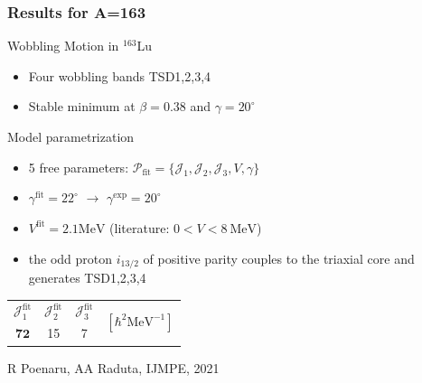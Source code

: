 \documentclass{beamer}
\begin{document}
\begin{frame}
  \frametitle{Results for A=163}
  \begin{exampleblock}{Wobbling Motion in $^{163}$Lu}
    \begin{itemize}
      \item Four wobbling bands TSD1,2,3,4
      \item Stable minimum at $\beta=0.38$ and $\gamma=20^\circ$
    \end{itemize}
    \end{exampleblock}
  \begin{alertblock}{Model parametrization}
    \begin{itemize}
      \item 5 free parameters: $\mathcal{P}_\text{fit}=\{\mathcal{J}_1,\mathcal{J}_2,\mathcal{J}_3,V,\gamma\}$
      \item $\gamma^\text{fit}=22^\circ$ $\rightarrow$ $\gamma^\text{exp}=20^\circ$
      \item $V^\text{fit}=2.1\text{MeV}$ (literature: $0<V<8\ \text{MeV}$)
      \item the odd proton $i_{13/2}$ of positive parity couples to the triaxial core and generates TSD1,2,3,4
    \end{itemize}
  \end{alertblock}
    \begin{table}
      \centering
      \begin{tabular}{|c|c|c|c|}
      \hline
      $\mathcal{J}_1^\text{fit}$ & $\mathcal{J}_2^\text{fit}$ & $\mathcal{J}_3^\text{fit}$ & \multirow{2}{*}{$\left[\hbar^2\text{MeV}^{-1}\right]$} \\ \cline{1-3}
      $\mathbf{72}$                         & 15                         & 7                         &                                                       \\ \hline
      \end{tabular}
    \end{table}
    \tiny{R Poenaru, AA Raduta, IJMPE, 2021}
\end{frame}
\end{document}
